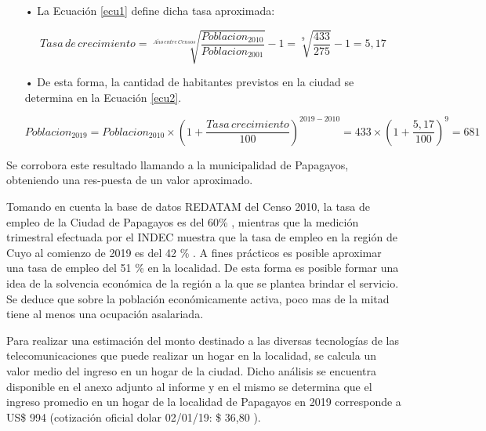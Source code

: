 \begin{enumerate}
\item[•]La Ecuación \ref{ecu1} define dicha tasa aproximada:

\begin{equation}
Tasa\, de \, crecimiento= \sqrt[A\tilde{n}o\, entre \, Censos]{  \frac{Poblacion_{2010}}{Poblacion_{2001}}  } -1 =\sqrt[9]{  \frac{433}{275}  } -1 = 5,17%
\label{ecu1}
\end{equation}

\item[•]De esta forma, la cantidad de habitantes previstos en la ciudad se determina en la Ecuación \ref{ecu2}.

\begin{equation}
Poblacion_{2019}=Poblacion_{2010} \times \left ( 1 + \frac{Tasa \, crecimiento}{100} \right )^{2019-2010}=433 \times \left ( 1 + \frac{5,17}{100} \right )^{9}=681
\label{ecu2}
\end{equation}

\end{enumerate}

Se corrobora este resultado llamando a la municipalidad de Papagayos, obteniendo una res-puesta de un valor aproximado.


Tomando en cuenta la base de datos REDATAM del Censo 2010, la tasa de empleo de la Ciudad de Papagayos es del 60\% \cite{ocupacion}, mientras que la medición trimestral efectuada por el INDEC muestra que la tasa de empleo en la región de Cuyo al comienzo de 2019 es del 42 \% \cite{base-datos-abiertos}. A fines prácticos es posible aproximar una tasa de empleo del 51 \% en la localidad. De esta forma es posible formar una idea de la solvencia económica de la región a la que se plantea brindar el servicio. Se deduce que sobre la población económicamente activa, poco mas de la mitad tiene al menos una ocupación asalariada. 


Para realizar una estimación del monto destinado a las diversas tecnologías de las telecomunicaciones que puede realizar un hogar en la localidad, se calcula un valor medio del ingreso en un hogar de la ciudad. Dicho análisis se encuentra disponible en el anexo adjunto al informe y en el mismo se determina que el ingreso promedio en un hogar de la localidad de Papagayos en 2019 corresponde a US\$ 994 (cotización oficial dolar 02/01/19: \$ 36,80 ). 


